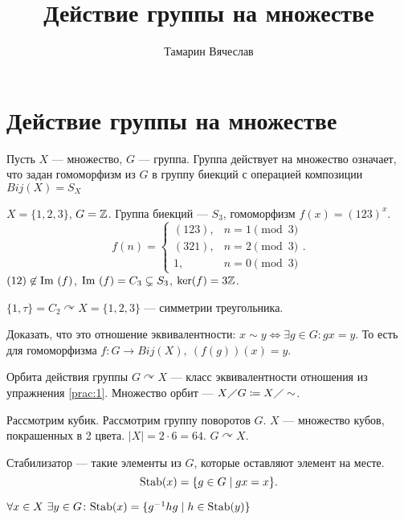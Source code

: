\documentclass[11pt,dvipsnames]{article}
\title{Действие группы на множестве}
\author{Тамарин Вячеслав}
\begin{document}
\maketitle
\section{Действие группы на множестве}

\begin{defn}
    Пусть  $ X$ ---  множество,  $ G $ --- группа. 
    Группа действует на множество означает, что задан гомоморфизм из $ G$ в группу биекций с операцией композиции $ B{ij}(X) = S_X$ 
\end{defn}
\begin{ex}
    $ X = \{1, 2, 3\}$, $ G = \mathbb{Z}$. 
    Группа биекций --- $ S_3$, гомоморфизм $ f(x) = (123)^{x}$.
    \[
	f(n) = 
	\begin{cases}
	    (123), & n  = 1 \pmod 3 \\
	    (321), & n  =2 \pmod 3 \\
	    1, & n  = 0 \pmod 3
	\end{cases}
    .\] 
    $ (12) \not\in {\mathop{\text{\rm Im}}}~(f)$, $ {\mathop{\text{\rm Im}}}~(f) = C_3 \subsetneq S_3$, $ \ker (f) = 3 \mathbb{Z}$.
\end{ex}
\begin{ex}
    $ \{1, \tau \} = C_2 \curvearrowright X = \{1, 2, 3\}$ --- симметрии треугольника.
\end{ex}
\begin{prac}\label{prac:1}
    Доказать, что это отношение эквивалентности:
    $ x \sim y \Longleftrightarrow  \exists g \in  G \colon gx = y$. То есть  для гомоморфизма $ f\colon G \to  B{ij}(X), ~(f(g))(x)=y $.
\end{prac}
\begin{defn}
    {\sf Орбита действия группы} $ G \curvearrowright X$ --- класс эквивалентности отношения из упражнения \ref{prac:1}. Множество орбит --- $X \diagup G \coloneqq X \diagup \sim $.
\end{defn}
\begin{prac}
    Рассмотрим кубик. Рассмотрим группу поворотов $ G$.
    $ X $ --- множество кубов, покрашенных в 2 цвета.  $ \left| X \right| = 2\cdot 6 = 64$. $ G \curvearrowright X$.	
\end{prac}
\begin{defn}
    {\sf Стабилизатор } --- такие элементы из  $ G$, которые оставляют элемент на месте. $$ {\mathop{\text{\rm Stab}}}(x) = \{g \in G \mid gx = x\}.$$
\end{defn}
\begin{st}
    $ \forall x \in X ~ \exists y \in G\colon  {\mathop{\text{\rm Stab}}} (x) = \{g^{-1} h g \mid h \in  {\mathop{\text{\rm Stab}}}(y)\}$
\end{st} 
\end{document}
